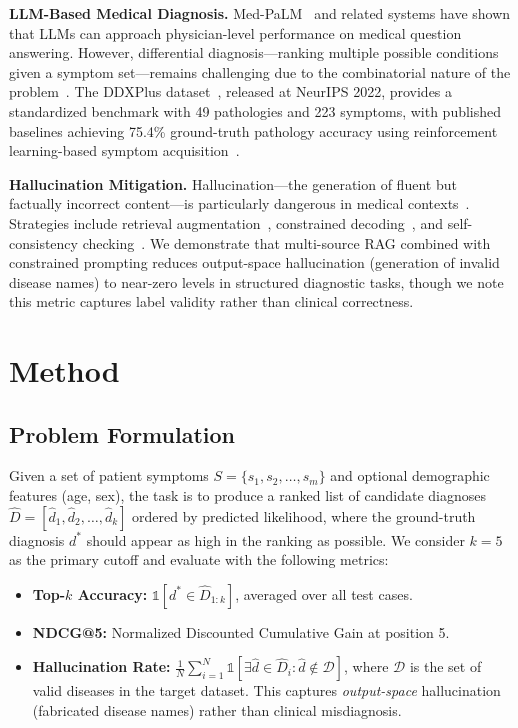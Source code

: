 \documentclass[runningheads]{llncs}
\begin{document}
\textbf{LLM-Based Medical Diagnosis.} Med-PaLM~\cite{singhal2023large} and related systems have shown that LLMs can approach physician-level performance on medical question answering. However, differential diagnosis---ranking multiple possible conditions given a symptom set---remains challenging due to the combinatorial nature of the problem~\cite{mcduff2023towards}. The DDXPlus dataset~\cite{fansi2022ddxplus}, released at NeurIPS 2022, provides a standardized benchmark with 49 pathologies and 223 symptoms, with published baselines achieving 75.4\% ground-truth pathology accuracy using reinforcement learning-based symptom acquisition~\cite{fansi2022ddxplus}.

\textbf{Hallucination Mitigation.} Hallucination---the generation of fluent but factually incorrect content---is particularly dangerous in medical contexts~\cite{ji2023survey,umapathi2023med}. Strategies include retrieval augmentation~\cite{shuster2021retrieval}, constrained decoding~\cite{lu2022neurologic}, and self-consistency checking~\cite{manakul2023selfcheckgpt}. We demonstrate that multi-source RAG combined with constrained prompting reduces output-space hallucination (generation of invalid disease names) to near-zero levels in structured diagnostic tasks, though we note this metric captures label validity rather than clinical correctness.

\section{Method}
\label{sec:method}

\subsection{Problem Formulation}

Given a set of patient symptoms $S = \{s_1, s_2, \ldots, s_m\}$ and optional demographic features (age, sex), the task is to produce a ranked list of candidate diagnoses $\hat{D} = [\hat{d}_1, \hat{d}_2, \ldots, \hat{d}_k]$ ordered by predicted likelihood, where the ground-truth diagnosis $d^*$ should appear as high in the ranking as possible. We consider $k{=}5$ as the primary cutoff and evaluate with the following metrics:

\begin{itemize}
    \item \textbf{Top-$k$ Accuracy:} $\mathbb{1}[d^* \in \hat{D}_{1:k}]$, averaged over all test cases.
    \item \textbf{NDCG@5:} Normalized Discounted Cumulative Gain at position 5.
    \item \textbf{Hallucination Rate:} $\frac{1}{N}\sum_{i=1}^{N} \mathbb{1}[\exists \hat{d} \in \hat{D}_i : \hat{d} \notin \mathcal{D}]$, where $\mathcal{D}$ is the set of valid diseases in the target dataset. This captures \emph{output-space} hallucination (fabricated disease names) rather than clinical misdiagnosis.
\end{itemize}
\end{document}
